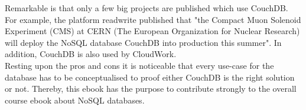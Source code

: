 %
%
%
%
Remarkable is that only a few big projects are published which use CouchDB. For example, the platform readwrite published that "the Compact Muon Solenoid Experiment (CMS) at CERN (The European Organization for Nuclear Research) will deploy the NoSQL database CouchDB into production this summer"\cite{KLINTFINLEY.2010}. In addition, CouchDB is also used by CloudWork\cite{BrunoPedro.2013}. \\
Resting upon the pros and cons it is noticeable that every use-case for the database has to be conceptualised to proof either CouchDB is the right solution or not. Thereby, this ebook has the purpose to contribute strongly to the overall course ebook about NoSQL databases. 

